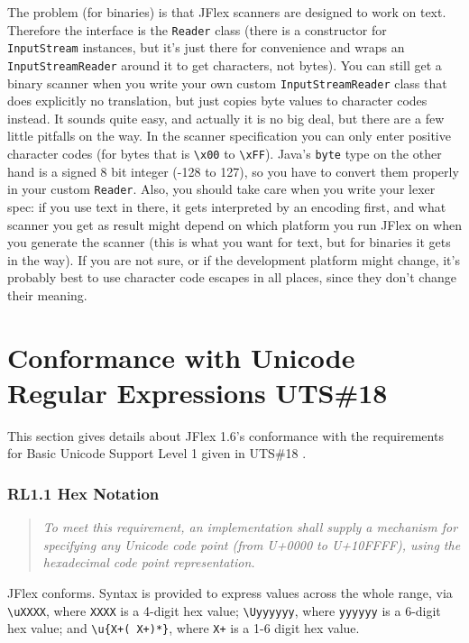 \documentclass[11pt]{scrartcl}
\newcommand{\ver}{1.6}
\begin{document}
The problem (for binaries) is that JFlex scanners are
designed to work on text. Therefore the interface is
the \texttt{Reader} class (there is a constructor
for \texttt{InputStream} instances, but it's just there
for convenience and wraps an \texttt{InputStreamReader}
around it to get characters, not bytes). 
You can still get a binary scanner when you write 
your own custom \texttt{InputStreamReader} class that
does explicitly no translation, but just copies
byte values to character codes instead. It sounds
quite easy, and actually it is no big deal, but there 
are a few little pitfalls on the way. In the scanner
specification you can only enter positive character
codes (for bytes that is \verb+\x00+
to \verb+\xFF+). Java's \texttt{byte} type on the other hand
is a signed 8 bit integer (-128 to 127), so you have to convert 
them properly in your custom \texttt{Reader}. Also, you should
take care when you write your lexer spec: if you
use text in there, it gets interpreted by an encoding
first, and what scanner you get as result might depend
on which platform you run JFlex on when you generate
the scanner (this is what you want for text, but for binaries it
gets in the way). If you are not sure, or if the development
platform might change, it's probably best to use character 
code escapes in all places, since they don't change their
meaning.

\section{Conformance with Unicode Regular Expressions UTS\#18}\label{unicoderegexconformance}

This section gives details about JFlex \ver's conformance with the
requirements for Basic Unicode Support Level 1 given in UTS\#18
\cite{unicode_rep}.

\subsubsection*{RL1.1 Hex Notation}

\begin{quote}
\emph{To meet this requirement, an implementation shall supply a mechanism
for specifying any Unicode code point (from U+0000 to U+10FFFF), using
the hexadecimal code point representation.}
\end{quote}

JFlex conforms. Syntax is provided to express values across the whole range,
via \verb+\uXXXX+, where \verb+XXXX+ is a 4-digit hex value; \verb+\Uyyyyyy+,
where \verb+yyyyyy+ is a 6-digit hex value; and \verb=\u{X+( X+)*}=, where
\verb=X+= is a 1-6 digit hex value.
\end{document}

